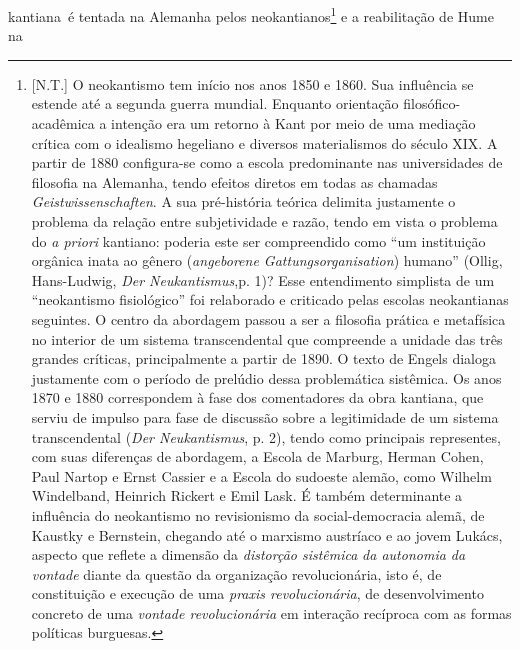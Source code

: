 kantiana~é tentada na Alemanha pelos neokantianos\footnote{{[}N.T.{]} O
  neokantismo tem início nos anos 1850 e 1860. Sua influência se estende
  até a segunda guerra mundial. Enquanto orientação filosófico-acadêmica
  a intenção era um retorno à Kant por meio de uma mediação crítica com
  o idealismo hegeliano e diversos materialismos do século XIX. A partir
  de 1880 configura-se como a escola predominante nas universidades de
  filosofia na Alemanha, tendo efeitos diretos em todas as chamadas
  \emph{Geistwissenschaften}. A sua pré-história teórica delimita
  justamente o problema da relação entre subjetividade e razão, tendo em
  vista o problema do \emph{a priori} kantiano: poderia este ser
  compreendido como ``um instituição orgânica inata ao gênero
  (\emph{angeborene Gattungsorganisation}) humano'' (Ollig, Hans-Ludwig,
  \emph{Der Neukantismus},p. 1)? Esse entendimento simplista de um
  ``neokantismo fisiológico'' foi relaborado e criticado pelas escolas
  neokantianas seguintes. O centro da abordagem passou a ser a filosofia
  prática e metafísica no interior de um sistema transcendental que
  compreende a unidade das três grandes críticas, principalmente a
  partir de 1890. O texto de Engels dialoga justamente com o período de
  prelúdio dessa problemática sistêmica. Os anos 1870 e 1880
  correspondem à fase dos comentadores da obra kantiana, que serviu de
  impulso para fase de discussão sobre a legitimidade de um sistema
  transcendental (\emph{Der Neukantismus}, p. 2), tendo como principais
  representes, com suas diferenças de abordagem, a Escola de Marburg,
  Herman Cohen, Paul Nartop e Ernst Cassier e a Escola do sudoeste
  alemão, como Wilhelm Windelband, Heinrich Rickert e Emil Lask. É
  também determinante a influência do neokantismo no revisionismo da
  social-democracia alemã, de Kaustky e Bernstein, chegando até o
  marxismo austríaco e ao jovem Lukács, aspecto que reflete a dimensão
  da \emph{distorção sistêmica} \emph{da autonomia da vontade} diante da
  questão da organização revolucionária, isto é, de constituição e
  execução de uma \emph{praxis revolucionária}, de desenvolvimento
  concreto de uma \emph{vontade revolucionária} em interação recíproca
  com as formas políticas burguesas.} e a reabilitação de Hume na
